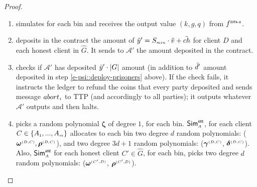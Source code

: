 \begin{proof}
\begin{enumerate}
\begin{enumerate}
\item\label{sim::E-PSI-ZSPA-A-invocation-} simulates \zspaa for each bin and receives the output value $( k,  g,  q)$ from $f^{\scriptscriptstyle \mathtt{ZSPA\text{-}A}}$.
%
\item deposits in the contract the  amount of $\ddot{y}'=S_{\scriptscriptstyle min}\cdot \ddot{v}+\ddot{ch}$ for client $D$ and each honest client in $\hat G$. It sends to $\mathcal{A}'$ the amount deposited in the contract. 
%
\item\label{sim::case1-check-Adv-deposited-y.|G|}  checks if $\mathcal{A}'$ has deposited $\ddot{y}'\cdot |G|$ amount (in addition to $\ddot{d}'$ amount deposited in step \ref{e-psi::deploy-prisoners} above). If the check fails, it instructs the ledger to refund the coins that every party deposited and sends message $abort_{\scriptscriptstyle 1}$ to TTP (and accordingly to all parties); it outputs whatever $\mathcal{A}'$ outputs and then halts.
%
\item picks a random polynomial ${\bm\zeta}$ of degree $1$, for each bin. $\mathsf{Sim}^{\scriptscriptstyle \mathtt{ANE}}_{\scriptscriptstyle A}$, for each client $  {  C}\in \{  {  A}_{ \scriptscriptstyle {   1}}, ...,   {  A}_{ \scriptscriptstyle {   m}}\}$ allocates to each bin two degree $d$ random polynomials: (${\bm\omega}^{ \scriptscriptstyle {  {(D,C)}}}, {\bm\rho}^{ \scriptscriptstyle {  {(D,C)}}}$), and   two  degree $3d+1$ random polynomials: (${\bm\gamma}^{ \scriptscriptstyle {  {(D,C)}}}$, ${\bm\delta}^{ \scriptscriptstyle {  {(D,C)}}}$). Also, $\mathsf{Sim}^{\scriptscriptstyle \mathtt{ANE}}_{\scriptscriptstyle A}$ for each honest client $C'\in \hat G$, for each bin, picks two  degree $d$ random polynomials: (${\bm\omega}^{ \scriptscriptstyle {  {(C',D)}}}$, ${\bm\rho}^{ \scriptscriptstyle {  {(C',D)}}}$). 


\end{enumerate}
\end{enumerate}
\end{proof}
